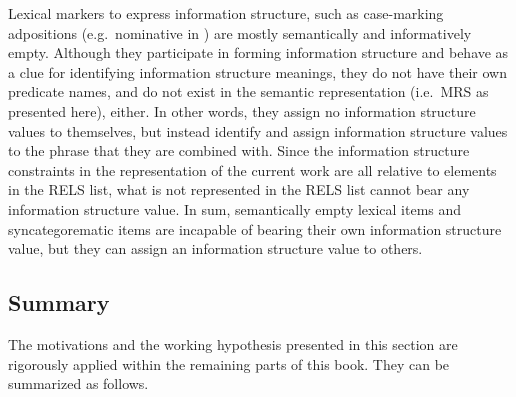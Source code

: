 

\noindent Lexical markers to express information structure, such as
case-marking adpositions (e.g.\ nominative \ga in ) are
mostly semantically and informatively empty. Although
they participate in forming information structure and behave as a clue
for identifying information structure meanings, they do not have their
own predicate names, and do not exist in the semantic representation
(i.e.\ MRS as presented here), either.  In other words, they
assign no information structure values to themselves, but instead
identify and assign information structure values to the phrase that
they are combined with.  Since the information structure constraints
in the representation of the current work are all relative to elements
in the RELS list, what is not represented in the RELS list cannot bear
any information structure value. In sum, semantically empty lexical
items and syncategorematic items are incapable of bearing their own
information structure value, but they can assign an information
structure value to others.



\subsection{Summary}
\label{9:sec:hierarchies}

The motivations and the working hypothesis presented in this section
are rigorously applied within the remaining parts of this
book. They can be summarized as follows.  



